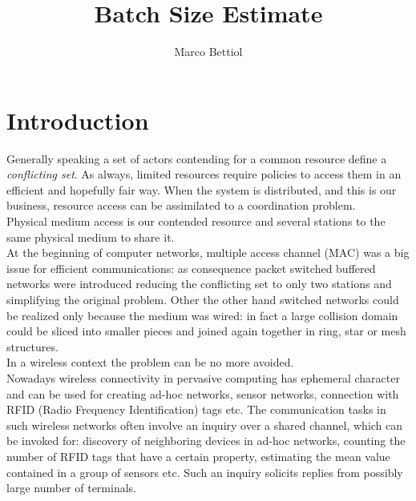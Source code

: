 \documentclass[12pt,a4paper]{report}
\title{Batch Size Estimate}
\author{Marco Bettiol}
\begin{document}

\tableofcontents
\listoffigures
\listoftables

\chapter{Introduction}

Generally speaking a set of actors contending for a common resource define a \emph{conflicting set}. As always, limited resources require policies to access them in an efficient and hopefully fair way. When the system is distributed, and this is our business, resource access can be assimilated to a coordination problem.\\ 
Physical medium access is our contended resource and several stations to the same physical medium to share it.\\ At the beginning of computer networks, multiple access channel (MAC) was a big issue for efficient communications: as consequence packet switched buffered networks were introduced reducing the conflicting set to only two stations and simplifying  the original problem. Other the other hand switched networks could be realized only because the medium was wired: in fact a large collision domain could be sliced into smaller pieces and joined again together in ring, star or mesh structures.\\ 
In a wireless context the problem can be no more avoided.\\  

Nowadays wireless connectivity in pervasive computing has ephemeral character and can be used for creating ad-hoc networks, sensor networks, connection with RFID (Radio Frequency Identification) tags etc. The communication tasks in such wireless networks often involve an inquiry over a shared channel, which can be invoked for: discovery of neighboring devices in ad-hoc networks, counting the number of RFID tags that have a certain property, estimating the mean value contained in a group of sensors etc. Such an inquiry solicits replies from possibly large number of terminals.\\
\end{document}
